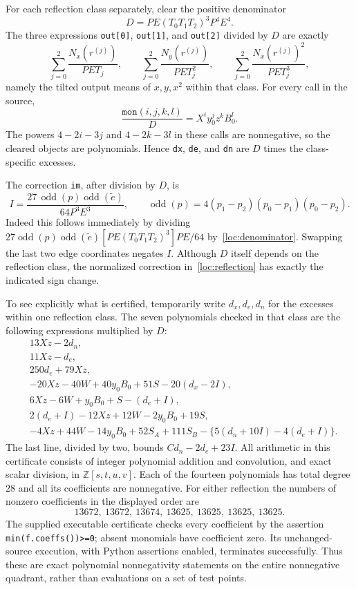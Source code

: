 For each reflection class separately, clear the positive denominator
\begin{equation}\label{loc:denominator}
 D=PE(T_0T_1T_2)^3P^4E^4.
\end{equation}
The three expressions \texttt{out[0]}, \texttt{out[1]}, and
\texttt{out[2]} divided by $D$ are exactly
\[
 \sum_{j=0}^2\frac{N_x(r^{(j)})}{PE T_j},\qquad
 \sum_{j=0}^2\frac{N_y(r^{(j)})}{PE T_j^2},\qquad
 \sum_{j=0}^2\frac{N_x(r^{(j)})^2}{PE T_j^3},
\]
namely the tilted output means of $x,y,x^2$ within that class.
For every call in the source,
\[
 \frac{\texttt{mon}(i,j,k,l)}D=X^i y_0^j z^kB_0^l.
\]
The powers $4-2i-3j$ and $4-2k-3l$ in these calls are nonnegative,
so the cleared objects are polynomials.  Hence \texttt{dx},
\texttt{de}, and \texttt{dn} are $D$ times the class-specific excesses.

The correction \texttt{im}, after division by $D$, is
\begin{equation}\label{loc:reflection}
 I=\frac{27\,\operatorname{odd}(p)\operatorname{odd}(\widetilde e)}
              {64P^3E^3},\qquad
 \operatorname{odd}(p)=4(p_1-p_2)(p_0-p_1)(p_0-p_2).
\end{equation}
Indeed this follows immediately by dividing
$27\operatorname{odd}(p)\operatorname{odd}(\widetilde e)
 [PE(T_0T_1T_2)^3]PE/64$ by~\eqref{loc:denominator}.
Swapping the last two edge coordinates negates $I$.
Although $D$ itself depends on the reflection class, the normalized
correction in~\eqref{loc:reflection} has exactly the indicated sign
change.

To see explicitly what is certified, temporarily write $d_x,d_e,d_n$
for the excesses within one reflection class.  The seven polynomials
checked in that class are the following expressions multiplied by $D$:
\begin{align*}
 &13Xz-2d_n,\\
 &11Xz-d_e,\\
 &250d_e+79Xz,\\
 &-20Xz-40W+40y_0B_0+51S-20(d_x-2I),\\
 &6Xz-6W+y_0B_0+S-(d_e+I),\\
 &2(d_e+I)-12Xz+12W-2y_0B_0+19S,\\
 &-4Xz+44W-14y_0B_0+52S_A+111S_B
       -\{5(d_n+10I)-4(d_e+I)\}.
\end{align*}
The last line, divided by two, bounds
$Cd_n-2d_e+23I$.  All arithmetic in this certificate consists of
integer polynomial addition and convolution, and exact scalar division,
in $\mathbb Z[s,t,u,v]$.  Each of the fourteen polynomials has total
degree $28$ and all its coefficients are nonnegative.  For either
reflection the numbers of nonzero coefficients in the displayed order
are
\[
 13672,\ 13672,\ 13674,\ 13625,\ 13625,\ 13625,\ 13625.
\]
The supplied executable certificate checks every coefficient by the
assertion \texttt{min(f.coeffs())>=0}; absent monomials have coefficient
zero.  Its unchanged-source execution, with Python assertions enabled,
terminates successfully.  Thus these are exact polynomial
nonnegativity statements on the entire nonnegative quadrant, rather
than evaluations on a set of test points.

